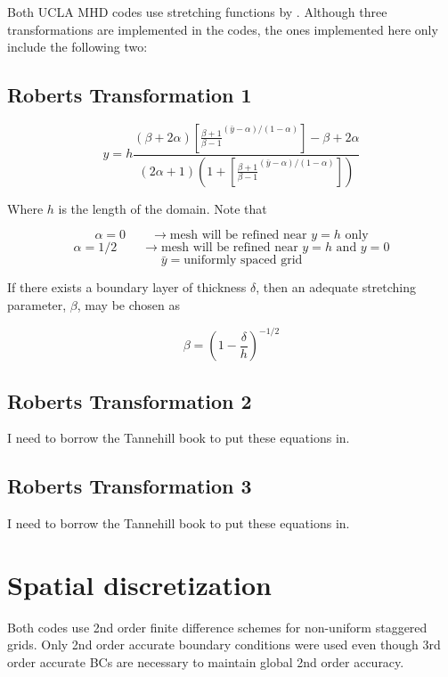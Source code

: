 \documentclass[11pt]{article}
\begin{document}
Both UCLA MHD codes use stretching functions by \cite{Roberts1971}. Although three transformations are implemented in the codes, the ones implemented here only include the following two:

\subsection{Roberts Transformation 1}
\begin{equation}
y = h \frac{(\beta + 2 \alpha) \left[ \frac{\beta+1}{\beta-1}^{(\bar{y}-\alpha)/(1-\alpha)} \right] - \beta + 2 \alpha}{(2\alpha+1)(1+\left[ \frac{\beta+1}{\beta-1}^{(\bar{y}-\alpha)/(1-\alpha)} \right])}
\end{equation}

Where $h$ is the length of the domain. Note that

\begin{equation}
	\alpha = 0 \qquad \rightarrow \text{mesh will be refined near $y=h$ only}
\end{equation}
\begin{equation}
	\alpha = 1/2 \qquad \rightarrow \text{mesh will be refined near $y=h$ and $y=0$}
\end{equation}
\begin{equation}
	\bar{y} = \text{uniformly spaced grid}
\end{equation}

If there exists a boundary layer of thickness $\delta$, then an adequate stretching parameter, $\beta$, may be chosen as

\begin{equation}
	\beta = \left( 1 - \frac{\delta}{h} \right)^{-1/2}
\end{equation}

\subsection{Roberts Transformation 2}
I need to borrow the Tannehill book to put these equations in.
\subsection{Roberts Transformation 3}
I need to borrow the Tannehill book to put these equations in.


\section{Spatial discretization}
Both codes use 2nd order finite difference schemes for non-uniform staggered grids. Only 2nd order accurate boundary conditions were used even though 3rd order accurate BCs are necessary to maintain global 2nd order accuracy.
\end{document}
